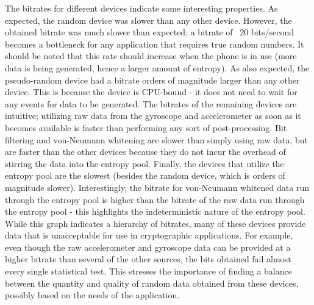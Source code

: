 The bitrates for different devices indicate some interesting properties.  As
expected, the random device was slower than any other device.  However, the
obtained bitrate was much slower than expected; a bitrate of ~20 bits/second
becomes a bottleneck for any application that requires true random numbers.  It
should be noted that this rate should increase when the phone is in use (more
data is being generated, hence a larger amount of entropy).  As also expected,
the pseudo-random device had a bitrate orders of magnitude larger than any other
device.  This is because the device is CPU-bound - it does not need to wait for
any events for data to be generated.  The bitrates of the remaining devices are
intuitive; utilizing raw data from the gyroscope and accelerometer as soon as it
becomes available is faster than performing any sort of post-processing.  Bit
filtering and von-Neumann whitening are slower than simply using raw data, but
are faster than the other devices because they do not incur the overhead of
stirring the data into the entropy pool.  Finally, the devices that utilize the
entropy pool are the slowest (besides the random device, which is orders of
magnitude slower).  Interestingly, the bitrate for von-Neumann whitened data run
through the entropy pool is higher than the bitrate of the raw data run through
the entropy pool - this highlights the indeterministic nature of the entropy
pool.  While this graph indicates a hierarchy of bitrates, many of these devices
provide data that is unacceptable for use in cryptographic applications.  For
example, even though the raw accelerometer and gyroscope data can be provided
at a higher bitrate than several of the other sources, the bits obtained fail
almost every single statistical test.  This stresses the importance of finding a
balance between the quantity and quality of random data obtained from these
devices, possibly based on the needs of the application.
